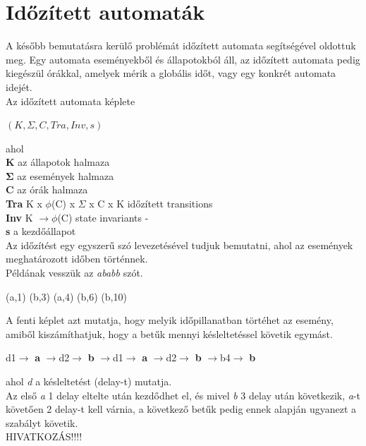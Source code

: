 \documentclass {report}
\begin{document}
\section{Időzített automaták}
A később bemutatásra kerülő problémát időzített automata segítségével oldottuk meg. Egy automata eseményekből és állapotokból áll, az időzített automata pedig kiegészül órákkal, amelyek mérik a globális időt, vagy egy konkrét automata idejét. \\
Az időzített automata képlete\\
\begin{center}
$(K, \Sigma, C, Tra, Inv, s)$\\
\end{center}
ahol\\
\indent \textbf{K} az állapotok halmaza\\
\indent $\mathbf{\Sigma}$ az események halmaza\\
\indent \textbf{C} az órák halmaza\\
\indent \textbf{Tra} K x $\phi$(C) x $ \Sigma $ x C x K időzített transitions\\
\indent \textbf{Inv} K $
\rightarrow  \phi$(C) state invariants -\\
\indent \textbf{s} a kezdőállapot \\
Az időzítést egy egyszerű szó levezetésével tudjuk bemutatni, ahol az események meghatározott időben történnek.\\
Példának vesszük az \emph{ababb} szót.
\begin{center}
(a,1) (b,3) (a,4) (b,6) (b,10)
\end{center}
A fenti képlet azt mutatja, hogy melyik időpillanatban törtéhet az esemény, amiből kiszámíthatjuk, hogy a betűk mennyi késleltetéssel követik egymást. 
\begin{center}
d1$\rightarrow$ \textbf{a} $\rightarrow$d2$\rightarrow$ \textbf{b} $\rightarrow$d1$\rightarrow$ \textbf{a} $\rightarrow$d2$\rightarrow$ \textbf{b} $\rightarrow$b4$\rightarrow$ \textbf{b}
\end{center}
ahol \emph{d} a késleltetést (delay-t) mutatja.\\
Az első \emph{a} 1 delay eltelte után kezdődhet el, és mivel \emph{b} 3 delay után következik, \emph{a}-t követően 2 delay-t kell várnia, a következő betűk pedig ennek alapján ugyanezt a szabályt követik. \\

HIVATKOZÁS!!!!
\end{document}
